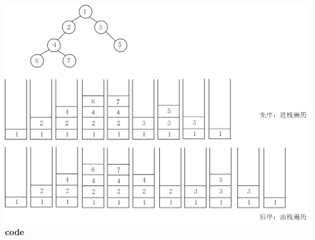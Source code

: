 \documentclass[UTF8,a4paper]{article}
\begin{document}
\includegraphics[scale=1]{6-37-38.png}
\textbf{code}
\end{document}
